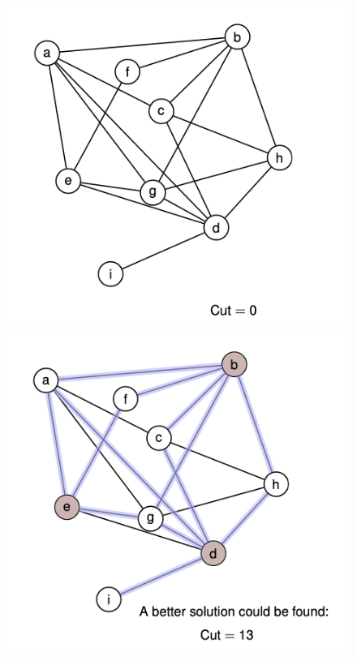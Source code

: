 \documentclass[letterpaper]{article}
\begin{document}
\begin{figure}[!h]
	\centering
	\begin{minipage}[t]{4cm}
		\centering
		\includegraphics[scale=0.5]{3.png}
	\end{minipage}
	\hspace{3cm}
	\begin{minipage}[t]{4cm}
		\centering
		\includegraphics[scale=0.5]{4.png}
	\end{minipage}
\end{figure}
\end{document}
